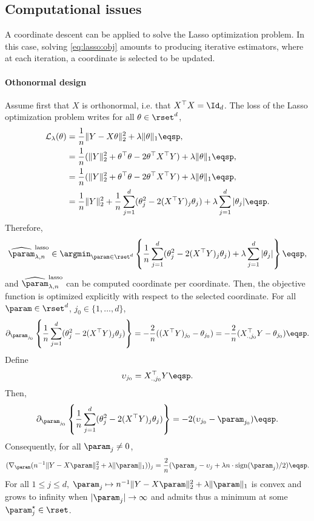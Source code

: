 \subsection{Computational issues}
A coordinate descent can be applied to solve the Lasso optimization problem. In this case, solving \eqref{eq:lasso:obj} amounts to producing iterative estimators, where at each iteration, a coordinate is selected to be updated.  

\paragraph{{\bf Othonormal design} } Assume first that $X$ is orthonormal, i.e. that $X^\top X = \Id_d$. The loss of the Lasso optimization problem writes for all $\theta\in\rset^d$,
\begin{align*}
\mathcal{L}_\lambda(\theta) &= \frac{1}{n}\|Y-X\theta\|_2^2 + \lambda \|\theta\|_1\eqsp,\\
&= \frac{1}{n}(\|Y\|_2^2+ \theta^\top \theta -2 \theta^\top X^\top Y) + \lambda \|\theta\|_1\eqsp,\\
&= \frac{1}{n}(\|Y\|_2^2+ \theta^\top \theta -2 \theta^\top X^\top Y) + \lambda \|\theta\|_1\eqsp,\\
&= \frac{1}{n}\|Y\|_2^2 + \frac{1}{n}\sum_{j=1}^{d}(\theta_j^2 -2 (X^\top Y)_j\theta_j) + \lambda \sum_{j=1}^d|\theta_j|\eqsp.
\end{align*}
Therefore,
$$
\widehat \param^{\mathrm{lasso}}_{\lambda,n}\in  \argmin_{\param\in\rset^d}  \left\{\frac{1}{n}\sum_{j=1}^{d}(\theta_j^2 -2 (X^\top Y)_j\theta_j) + \lambda \sum_{j=1}^d|\theta_j|\right\}\eqsp,
$$
and $\widehat \param^{\mathrm{lasso}}_{\lambda,n}$ can be computed coordinate per coordinate. Then, the objective function  is optimized explicitly  with respect to the selected coordinate. For all $\param \in \rset^d$,  $j_0\in\{1,\ldots,d\}$,
\[
\partial_{\param_{j_0}} \left\{\frac{1}{n}\sum_{j=1}^{d}(\theta_j^2 -2 (X^\top Y)_j\theta_j)\right\} = - \frac{2}{n}((X^\top Y)_{j_0} - \theta_{j_0}) = - \frac{2}{n}(X_{.,j_0}^\top Y - \theta_{j_0})\eqsp.
\]
Define
\[
\upsilon_{j_0}=X_{.,j_0}^\top Y\eqsp.
\]
Then,
\[
\partial_{\param_{j_0}} \left\{\frac{1}{n}\sum_{j=1}^{d}(\theta_j^2 -2 (X^\top Y)_j\theta_j)\right\} = -2( \upsilon_{j_0} - \param_{j_0})\eqsp.
\]
Consequently, for all $\param_j \neq 0$, 
\[
(\nabla_\param ( n^{-1}\|Y - X\param\|_2^2 +  \lambda\|\param\|_1))_j= \frac{2}{n}( \param_j - \upsilon_j + \lambda n\cdot\textrm{sign}(\param_j)/2)\eqsp.
\]
For all $1\leqslant j\leqslant d$,  $\param_j \mapsto  n^{-1}\|Y - X\param\|_2^2 + \lambda\|\param\|_1$ is convex and grows to infinity when $|\param_j|\to \infty$ and admits thus a minimum at some $\param_j^{\star}\in\rset$. 
